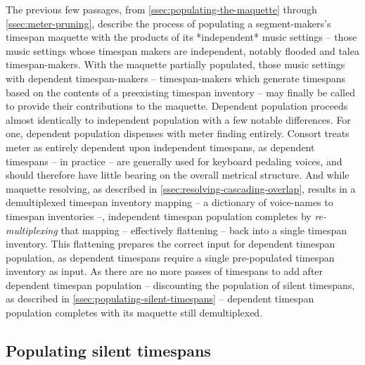 The previous few passages, from \autoref{ssec:populating-the-maquette} through
\autoref*{ssec:meter-pruning}, describe the process of populating a
segment-makers's timespan maquette with the products of its *independent* music
settings -- those music settings whose timespan makers are independent, notably
flooded and talea timespan-makers. With the maquette partially populated, those
music settings with dependent timespan-makers -- timespan-makers which generate
timespans based on the contents of a preexisting timespan inventory -- may
finally be called to provide their contributions to the maquette. Dependent
population proceeds almost identically to independent population with a few
notable differences. For one, dependent population dispenses with meter finding
entirely. Consort treats meter as entirely dependent upon independent
timespans, as dependent timespans -- in practice -- are generally used for
keyboard pedaling voices, and should therefore have little bearing on the
overall metrical structure. And while maquette resolving, as described in
\autoref{ssec:resolving-cascading-overlap}, results in a demultiplexed timespan
inventory mapping -- a dictionary of voice-names to timespan inventories --,
independent timespan population completes by \emph{re-multiplexing} that
mapping -- effectively flattening -- back into a single timespan inventory.
This flattening prepares the correct input for dependent timespan population,
as dependent timespans require a single pre-populated timespan inventory as
input. As there are no more passes of timespans to add after dependent timespan
population -- discounting the population of silent timespans, as described in
\autoref{ssec:populating-silent-timespans} -- dependent timespan population
completes with its maquette still demultiplexed.

\subsection{Populating silent timespans}
\label{ssec:populating-silent-timespans}

